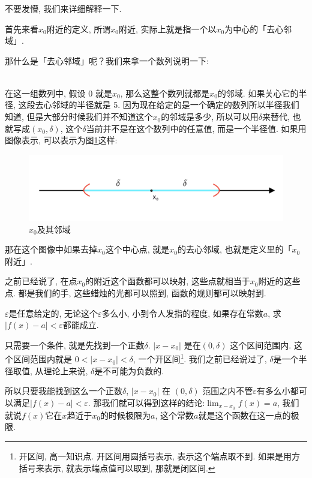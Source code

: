 不要发懵, 我们来详细解释一下. 

首先来看$x_0$附近的定义, 所谓$x_0$附近, 实际上就是指一个以$x_0$为中心的「去心邻域」. 

那什么是「去心邻域」呢？我们来拿一个数列说明一下: 

\begin{align*}
  [-5,-4,-3,-2,-1,0,1,2,3,4,5]
\end{align*}

在这一组数列中, 假设 0 就是$x_0$, 那么这整个数列就都是$x_0$的邻域. 如果关心它的半径, 这段去心邻域的半径就是 5. 因为现在给定的是一个确定的数列所以半径我们知道, 但是大部分时候我们并不知道这个$x_0$的邻域是多少, 所以可以用$\delta$来替代, 也就写成$(x_0, \delta)$, 这个$\delta$当前并不是在这个数列中的任意值, 而是一个半径值. 如果用图像表示, 可以表示为图\ref{fig:img8_1}这样: 

\begin{figure}[ht]
  \centering
  \includegraphics[width=1\textwidth]{asset/c1569200-3866-4cf7-8ec1-6cc23521eaff.png}
  \caption{$x_0$及其邻域}
  \label{fig:img8_1}
\end{figure}

那在这个图像中如果去掉$x_0$这个中心点, 就是$x_0$的去心邻域, 也就是定义里的「$x_0$ 附近」. 

之前已经说了, 在点$x_0$的附近这个函数都可以映射, 这些点就相当于$x_0$附近的这些点. 都是我们的手, 这些蜡烛的光都可以照到, 函数的规则都可以映射到. 

$\varepsilon$是任意给定的, 无论这个$\varepsilon$多么小, 小到令人发指的程度, 如果存在常数$a$, 求$|f(x)-a| < \varepsilon$都能成立. 

只需要一个条件, 就是先找到一个正数$\delta$. $|x-x_0|$ 是在$(0,\delta)$ 这个区间范围内. 这个区间范围内就是 $0<|x-x_0|<\delta$, 一个开区间\footnote{开区间, 高一知识点. 开区间用圆括号表示, 表示这个端点取不到. 如果是用方括号来表示, 就表示端点值可以取到, 那就是闭区间.}. 我们之前已经说过了, $\delta$是一个半径取值, 从理论上来说, $\delta$是不可能为负数的. 

所以只要我能找到这么一个正数$\delta$, $|x-x_0|$ 在 $(0, \delta)$ 范围之内不管$\varepsilon$有多么小都可以满足$|f(x) - a| < \varepsilon$. 那我们就可以得到这样的结论:$\lim_{x-x_0}f(x) = a$, 我们就说$f(x)$它在$x$趋近于$x_0$的时候极限为$a$, 这个常数$a$就是这个函数在这一点的极限.

